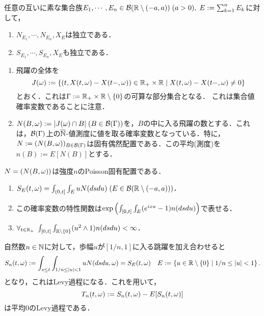 \documentclass[uplatex,dvipdfmx]{jsreport}
\begin{document}
\begin{lemma}
    任意の互いに素な集合族$E_1,\cdots,E_n\in\mathcal{B}(\mathbb{R}\setminus(-a,a))\;(a>0),\;E:=\sum_{k=1}^nE_k$に対して，
    \begin{enumerate}
        \item $N_{E_1},\cdots,N_{E_n},X_E$は独立である．
        \item $S_{E_1},\cdots,S_{E_n},X_E$も独立である．
    \end{enumerate}
\end{lemma}

\begin{notation}\mbox{}
    \begin{enumerate}
        \item 飛躍の全体を
        \[J(\omega):=\left\{(t,X(t,\omega)-X(t-,\omega))\in\mathbb{R}_+\times\mathbb{R}\mid X(t,\omega)-X(t-,\omega)\ne0\right\}\]
        とおく．これは$\Gamma:=\mathbb{R}_+\times\mathbb{R}\setminus\{0\}$の可算な部分集合となる．
        これは集合値確率変数であることに注意．
        \item $N(B,\omega):=\lvert J(\omega)\cap B\rvert\;(B\in\mathcal{B}(\Gamma))$を，$B$の中に入る飛躍の数とする．これは，$\mathcal{B}(\Gamma)$上の$\overline{\mathbb{N}}$-値測度に値を取る確率変数となっている．特に，$N:=(N(B,\omega))_{B\in\mathcal{B}(\Gamma)}$は固有偶然配置である．この平均(測度)を$n(B):=E[N(B)]$とする．
    \end{enumerate}
\end{notation}

\begin{lemma}
    $N=(N(B,\omega))$は強度$n$のPoisson固有配置である．
\end{lemma}

\begin{lemma}\mbox{}
    \begin{enumerate}
        \item $S_E(t,\omega)=\int_{(0,t]}\int_E uN(dsdu)\;(E\in\mathcal{B}(\mathbb{R}\setminus(-a,a)))$．
        \item この確率変数の特性関数は$\exp\left(\int_{[0,t]}\int_E(e^{izu}-1)n(dsdu)\right)$で表せる．
        \item $\forall_{t\in\mathbb{R}_+}\;\int_{[0,t]}\int_{\mathbb{R}\setminus\{0\}}(u^2\land 1)n(dsdu)<\infty$．
    \end{enumerate}
\end{lemma}

\begin{notation}
    自然数$n\in\mathbb{N}$に対して，歩幅$u$が$[1/n,1]$に入る跳躍を加え合わせると
    \[S_n(t,\omega):=\int_{s\le t}\int_{1/n\le\lvert u\rvert<1}uN(dsdu,\omega)=S_E(t,\omega)\quad E:=\left\{u\in\mathbb{R}\setminus\{0\}\mid 1/n\le\lvert u\rvert<1\right\}.\]
    となり，これはLevy過程になる．これを用いて，
    \[T_n(t,\omega):=S_n(t,\omega)-E[S_n(t,\omega)]\]
    は平均$0$のLevy過程である．
\end{notation}
\end{document}
